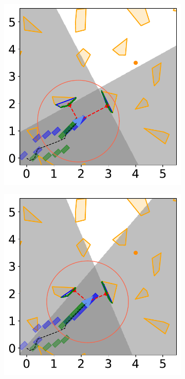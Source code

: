 \begin{figure}[H]
    \begin{subfigure}{0.30\textwidth}
        \centering
        \includegraphics[width=\textwidth]{figures/Simulations/sim2unkenv/frame_4.pdf}
    \end{subfigure}
    \hspace{1em}
    \begin{subfigure}{0.30\textwidth}
        \centering
        \includegraphics[width=\textwidth]{figures/Simulations/sim2unkenv/frame_5.pdf}
    \end{subfigure}%


\end{figure}
